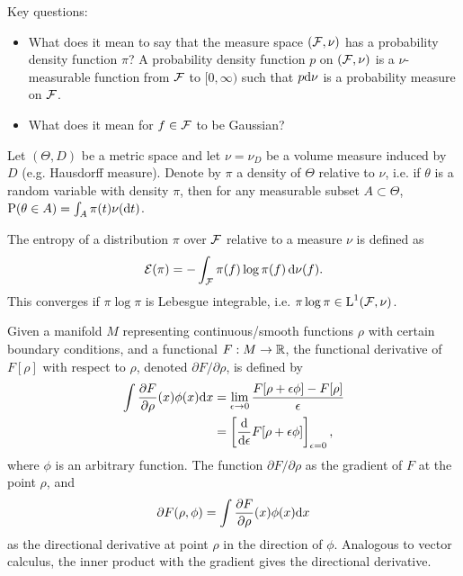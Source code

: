 Key questions:
\begin{itemize}
  \item What does it mean to say that the measure space $({\mathcal F},\nu)$ has a probability density function $\pi$? A probability density function $p$ on $({\mathcal F}, \nu)$ is a $\nu$-measurable function from ${\mathcal F}$ to $[0, \infty)$ such that $p \text{d}\nu$ is a probability measure on ${\mathcal F}$.
  \item What does it mean for $f \in {\mathcal F}$ to be Gaussian?
\end{itemize}

Let $(\Theta,D)$ be a metric space and let $\nu = \nu_D$ be a volume measure induced by $D$ (e.g. Hausdorff measure).
  Denote by $\pi$ a density of $\Theta$ relative to $\nu$, i.e. if $\theta$ is a random variable with density $\pi$, then for any measurable subset $A \subset \Theta$, $\operatorname{P}(\theta \in A) = \int_A \pi(t)\nu(\text{d} t)$.


\begin{definition}[Entropy]
  The entropy of a distribution $\pi$ over ${\mathcal F}$ relative to a measure $\nu$ is defined as
  \[
    {\mathcal E}(\pi) = - \int_{\mathcal F} \pi(f) \log \pi(f) \, \text{d}\nu(f).
  \]
  This converges if $\pi \log\pi$ is Lebesgue integrable, i.e. $\pi\log\pi \in \text{L}^1({\mathcal F},\nu)$.
\end{definition}

\begin{definition}
  Given a manifold $M$ representing continuous/smooth functions $\rho$ with certain boundary conditions, and a functional $F:M\to\mathbb{R}$, the functional derivative of $F[\rho]$ with respect to $\rho$, denoted $\partial F/\partial\rho$, is defined by
  \begin{align*}
    \int \frac{\partial F}{\partial\rho}(x)\phi(x)\text{d} x
    &= \lim_{\epsilon\to 0} \frac{F[\rho + \epsilon\phi] - F[\rho]}{\epsilon} \\
    &= \left[ \frac{\text{d}}{\text{d} \epsilon} F[\rho + \epsilon\phi] \right]_{\epsilon=0},
  \end{align*}
  where $\phi$ is an arbitrary function.
  The function $\partial F/\partial\rho$ as the gradient of $F$ at the point $\rho$, and
  \[
    \partial F(\rho,\phi) = \int \frac{\partial F}{\partial\rho}(x)\phi(x) \text{d} x
  \]
  as the directional derivative at point $\rho$ in the direction of $\phi$.
  Analogous to vector calculus, the inner product with the gradient gives the directional derivative.
\end{definition}

